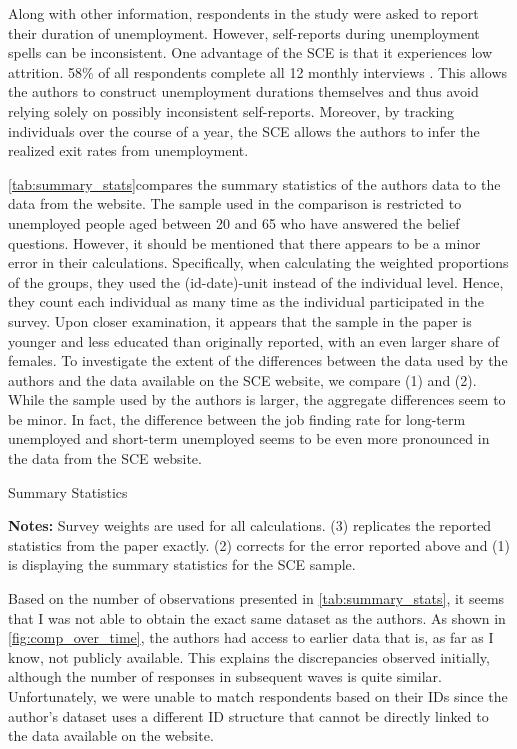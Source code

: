 \documentclass[11pt,a4paper,leqno]{article}
\begin{document}
Along with other information, respondents in the study were asked to report their duration of unemployment. However, self-reports during unemployment spells can be inconsistent.
 One advantage of the SCE is that it experiences low attrition. 58\% of all respondents complete all 12 monthly interviews \parencite{SCEOverview}. This allows the authors to construct unemployment durations themselves and thus avoid relying solely on possibly inconsistent self-reports.  Moreover, by tracking individuals over the course of a year, the SCE allows the authors to infer the realized exit rates from unemployment. 
 
 \autoref{tab:summary_stats}compares the summary statistics of the authors data to the data from the website. The sample used in the comparison is restricted to unemployed people aged between 20 and 65 who have answered the belief questions. However, it should be mentioned that there appears to be a minor error in their calculations. Specifically, when calculating the weighted proportions of the groups, they used the (id-date)-unit instead of the individual level. Hence, they count each individual as many time as the individual participated in the survey. Upon closer examination, it appears that the sample in the paper is younger and less educated than originally reported, with an even larger share of females. To investigate the extent of the differences between the data used by the authors and the data available on the SCE website, we compare (1) and (2). While the sample used by the authors is larger, the aggregate differences seem to be minor. In fact, the difference between the job finding rate for long-term unemployed and short-term unemployed seems to be even more pronounced in the data from the SCE website.  
 
    \begin{table}[!htbp] 
    \centering 
	\caption{Summary Statistics} 
	\label{tab:summary_stats} 
 	
 	\begin{minipage}[center]{0.7\textwidth}
 	\caption*{\footnotesize \textbf{Notes:} Survey weights are used for all calculations. (3) replicates the reported statistics from the paper exactly. (2) corrects for the error reported above and (1) is displaying the summary statistics for the SCE sample.}
 	\end{minipage}
	\end{table}

Based on the number of observations presented in \autoref{tab:summary_stats}, it seems that I was not able to obtain the exact same dataset as the authors. As shown in \autoref{fig:comp_over_time}, the authors had access to earlier data that is, as far as I know, not publicly available. This explains the discrepancies observed initially, although the number of responses in subsequent waves is quite similar. Unfortunately, we were unable to match respondents based on their IDs since the author's dataset uses a different ID structure that cannot be directly linked to the data available on the website.
\end{document}
